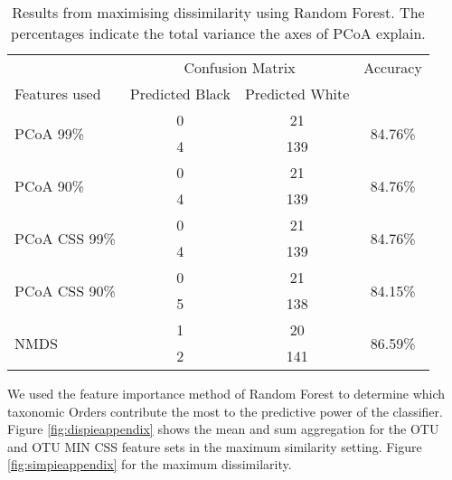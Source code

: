 \begin{table}[h]
	\centering
	\begin{tabular}{l c  c c}
		\toprule
		&\multicolumn{2}{c}{Confusion Matrix} & Accuracy\\
		Features used & Predicted Black&Predicted White&\\
		\midrule
		\multirow{2}{*}{PCoA 99\%} &0 &21&\multirow{2}{*}{84.76\%}\\
		&	4&139&\\
		\cmidrule{2-3}
		\multirow{2}{*}{PCoA 90\%}  &0 &21&\multirow{2}{*}{84.76\%}\\
		&	4&139&\\
		\cmidrule{2-3}
		\multirow{2}{*}{PCoA CSS 99\%}  &0 &21&\multirow{2}{*}{84.76\%}\\
		&	4&139&\\
		\cmidrule{2-3}
		\multirow{2}{*}{PCoA CSS 90\%} &0 &21&\multirow{2}{*}{84.15\%}\\
		&	5&138&\\
		\cmidrule{2-3}
		\multirow{2}{*}{NMDS}&1 &20&\multirow{2}{*}{86.59\%}\\
		&	 2&141&\\
		\bottomrule
	\end{tabular}
	\caption{Results from maximising dissimilarity using Random Forest. The percentages indicate the total variance the axes of PCoA explain.}
	\label{table:rfrdissimilarityappendix}
\end{table}

We used the feature importance method of Random Forest to determine which taxonomic Orders contribute the most to the predictive power of the classifier. Figure \ref{fig:dispieappendix} shows the mean and sum aggregation for the OTU and OTU MIN CSS feature sets in the maximum similarity setting. Figure \ref{fig:simpieappendix} for the maximum dissimilarity.

